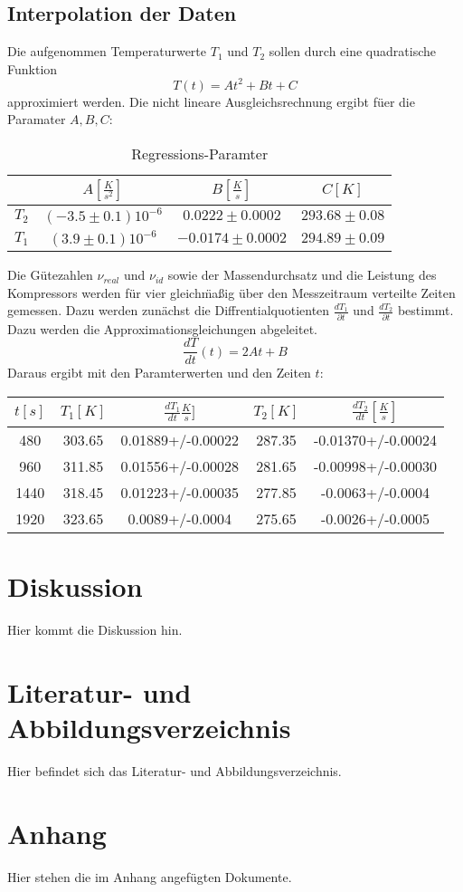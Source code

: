 \documentclass[11pt]{article}
\begin{document}
\subsection{Interpolation der Daten}
Die aufgenommen Temperaturwerte $T_1$ und $T_2$ sollen durch eine quadratische Funktion
\begin{equation}
T(t) = At^2 + Bt + C
\end{equation}
approximiert werden. Die  nicht lineare Ausgleichsrechnung ergibt f\"uer die Paramater $A, B, C$:
\begin{table}[H]
\centering
\begin{tabular}{c|c|c|c}

& $A [\frac{K}{s^2}]$ & $B [\frac{K}{s}]$ & $C [K]$ \\
\hline
$T_2$& $(-3.5\pm0.1)10^{-6}$ & $0.0222\pm0.0002$ &$ 293.68\pm0.08$\\
$T_1$ & $(3.9\pm0.1)10^{-6}$ & $-0.0174\pm0.0002$ & $294.89\pm0.09$\\
\end{tabular}
\caption{Regressions-Paramter}
\end{table} \noindent
Die  G\"utezahlen $\nu_{real}$ und $\nu_{id}$ sowie der Massendurchsatz und die Leistung des Kompressors werden f\"ur vier gleich\"ma\ss ig \"uber den Messzeitraum verteilte Zeiten gemessen. Dazu werden zun\"achst die Diffrentialquotienten $\frac{d T_1}{\partial t}$ und $\frac{dT_2}{\partial t}$ bestimmt. Dazu werden die Approximationsgleichungen abgeleitet. 
\begin{equation}
\frac{dT}{dt}(t) = 2At + B
\end{equation}
Daraus ergibt mit den Paramterwerten und den Zeiten $t$:
\begin{table}[H]
\centering 
\begin{tabular}{c|c|c|c|c}
\hline
$t [s]$ & $T_1 [K]$ & $\frac{dT_1}{dt} \frac{K}{s}]$ & $T_2 [K]$ & $\frac{dT_2}{dt} [\frac Ks]$  \\
\hline
480 & 303.65 & 0.01889+/-0.00022 & 287.35 & -0.01370+/-0.00024 \\
960 & 311.85 & 0.01556+/-0.00028 & 281.65 & -0.00998+/-0.00030 \\
1440 & 318.45 & 0.01223+/-0.00035 & 277.85 & -0.0063+/-0.0004 \\
1920 & 323.65 & 0.0089+/-0.0004 & 275.65 & -0.0026+/-0.0005 \\
\hline
\end{tabular}
\end{table}
\section{Diskussion}
Hier kommt die Diskussion hin.
\section{Literatur- und Abbildungsverzeichnis}
Hier befindet sich das Literatur- und Abbildungsverzeichnis.
\section{Anhang}
Hier stehen die im Anhang angefügten Dokumente.
\end{document}
